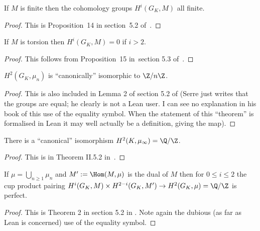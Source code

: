 \begin{theorem}
    \label{local_galois_coh_finite}
    \notready
    If $M$ is finite then the cohomology groups $H^i(G_K,M)$ all finite.
\end{theorem}
\begin{proof}
    This is Proposition~14 in section~5.2 of~\cite{serre-galcoh}.
\end{proof}

\begin{theorem} \label{local_galois_coh_dim_two}\notready
  If $M$ is torsion then $H^i(G_K,M)=0$ if $i>2$.
\end{theorem}
\begin{proof} This follows from Proposition~15 in~section 5.3 of~\cite{serre-galcoh}.
\end{proof}

\begin{theorem} 
    \label{local_galois_coh_top_degree}
    \notready
    $H^2(G_K,\mu_n)$ is ``canonically'' isomorphic to $\Z/n\Z$.
\end{theorem}
\begin{proof} This is also included in Lemma 2 of section 5.2 of \cite{serre-galcoh} (Serre just writes that the groups are equal; he clearly is not a Lean user. I can see no explanation in his book of this use of the equality symbol. When the statement of this ``theorem'' is formalised in Lean it may well actually be a definition, giving the map).
\end{proof}

\begin{theorem}\notready There is a ``canonical'' isomorphism $H^2(K,\mu_\infty)=\Q/\Z$.
\end{theorem}
\begin{proof}\notready
This is in Theorem II.5.2 in~\cite{serre-galcoh}.
\end{proof}

\begin{theorem} \label{local_galois_coh_poincare}\notready
    If $\mu=\bigcup_{n\geq1}\mu_n$ and $M':=\Hom(M,\mu)$ is the dual of $M$ then for
    $0\leq i\leq 2$ the cup product pairing $H^i(G_K,M)\times H^{2-i}(G_K,M')\to H^2(G_K,\mu)=\Q/\Z$ is perfect.
\end{theorem}
\begin{proof}\notready This is Theorem 2 in section 5.2 in \cite{serre-galcoh}. Note again
    the dubious (as far as Lean is concerned) use of the equality symbol.
\end{proof}

